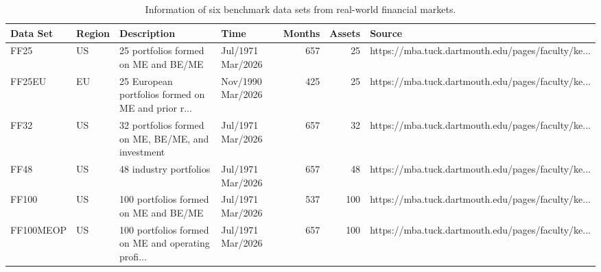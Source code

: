 \begin{table}
\centering
\caption{Information of six benchmark data sets from real-world financial markets.}
\label{tab:dataset_information}
\begin{tabular}{llllrrl}
\toprule
 Data Set & Region &                                        Description &                Time &  Months &  Assets &                                             Source \\
\midrule
     FF25 &     US &               25 portfolios formed on ME and BE/ME & Jul/1971 ~ Mar/2026 &     657 &      25 & https://mba.tuck.dartmouth.edu/pages/faculty/ke... \\
   FF25EU &     EU & 25 European portfolios formed on ME and prior r... & Nov/1990 ~ Mar/2026 &     425 &      25 & https://mba.tuck.dartmouth.edu/pages/faculty/ke... \\
     FF32 &     US &  32 portfolios formed on ME, BE/ME, and investment & Jul/1971 ~ Mar/2026 &     657 &      32 & https://mba.tuck.dartmouth.edu/pages/faculty/ke... \\
     FF48 &     US &                             48 industry portfolios & Jul/1971 ~ Mar/2026 &     657 &      48 & https://mba.tuck.dartmouth.edu/pages/faculty/ke... \\
    FF100 &     US &              100 portfolios formed on ME and BE/ME & Jul/1971 ~ Mar/2026 &     537 &     100 & https://mba.tuck.dartmouth.edu/pages/faculty/ke... \\
FF100MEOP &     US & 100 portfolios formed on ME and operating profi... & Jul/1971 ~ Mar/2026 &     657 &     100 & https://mba.tuck.dartmouth.edu/pages/faculty/ke... \\
\bottomrule
\end{tabular}
\end{table}
